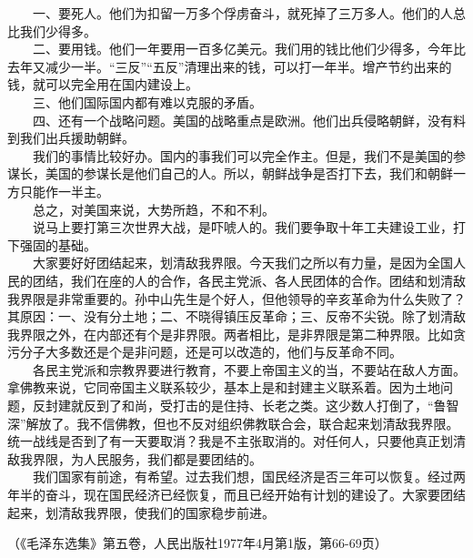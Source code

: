 \documentclass[cn,11pt,chinese]{elegantbook}
\begin{document}
　　一、要死人。他们为扣留一万多个俘虏奋斗，就死掉了三万多人。他们的人总比我们少得多。\\
　　二、要用钱。他们一年要用一百多亿美元。我们用的钱比他们少得多，今年比去年又减少一半。“三反”“五反”清理出来的钱，可以打一年半。增产节约出来的钱，就可以完全用在国内建设上。\\
　　三、他们国际国内都有难以克服的矛盾。\\
　　四、还有一个战略问题。美国的战略重点是欧洲。他们出兵侵略朝鲜，没有料到我们出兵援助朝鲜。\\
　　我们的事情比较好办。国内的事我们可以完全作主。但是，我们不是美国的参谋长，美国的参谋长是他们自己的人。所以，朝鲜战争是否打下去，我们和朝鲜一方只能作一半主。\\
　　总之，对美国来说，大势所趋，不和不利。\\
　　说马上要打第三次世界大战，是吓唬人的。我们要争取十年工夫建设工业，打下强固的基础。\\
　　大家要好好团结起来，划清敌我界限。今天我们之所以有力量，是因为全国人民的团结，我们在座的人的合作，各民主党派、各人民团体的合作。团结和划清敌我界限是非常重要的。孙中山先生是个好人，但他领导的辛亥革命为什么失败了？其原因：一、没有分土地；二、不晓得镇压反革命；三、反帝不尖锐。除了划清敌我界限之外，在内部还有个是非界限。两者相比，是非界限是第二种界限。比如贪污分子大多数还是个是非问题，还是可以改造的，他们与反革命不同。\\
　　各民主党派和宗教界要进行教育，不要上帝国主义的当，不要站在敌人方面。拿佛教来说，它同帝国主义联系较少，基本上是和封建主义联系着。因为土地问题，反封建就反到了和尚，受打击的是住持、长老之类。这少数人打倒了，“鲁智深”解放了。我不信佛教，但也不反对组织佛教联合会，联合起来划清敌我界限。统一战线是否到了有一天要取消？我是不主张取消的。对任何人，只要他真正划清敌我界限，为人民服务，我们都是要团结的。\\
　　我们国家有前途，有希望。过去我们想，国民经济是否三年可以恢复。经过两年半的奋斗，现在国民经济已经恢复，而且已经开始有计划的建设了。大家要团结起来，划清敌我界限，使我们的国家稳步前进。\\
\begin{flushright}
（《毛泽东选集》第五卷，人民出版社1977年4月第1版，第66-69页）\end{flushright}
　\newpage
\end{document}
